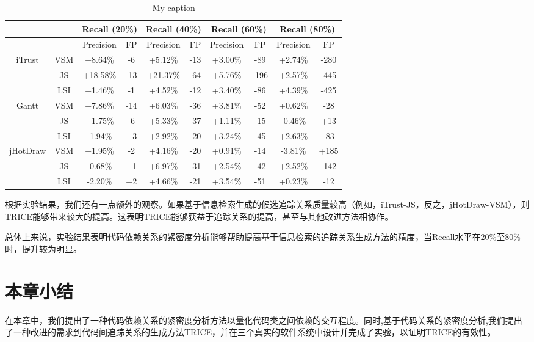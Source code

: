 \begin{table}[]
\centering
\caption{My caption}
\label{my-label}
\begin{tabular}{@{}cccccccccc@{}}
\toprule
         &     & \multicolumn{2}{c}{Recall (20\%)} & \multicolumn{2}{c}{Recall (40\%)} & \multicolumn{2}{c}{Recall (60\%)} & \multicolumn{2}{c}{Recall (80\%)} \\ \midrule
         &     & Precision          & FP           & Precision          & FP           & Precision          & FP           & Precision          & FP           \\
iTrust   & VSM & +8.64\%            & -6           & +5.12\%            & -13          & +3.00\%            & -89          & +2.74\%            & -280         \\
         & JS  & +18.58\%           & -13          & +21.37\%           & -64          & +5.76\%            & -196         & +2.57\%            & -445         \\
         & LSI & +1.46\%            & -1           & +4.52\%            & -12          & +3.40\%            & -86          & +4.39\%            & -425         \\
Gantt    & VSM & +7.86\%            & -14          & +6.03\%            & -36          & +3.81\%            & -52          & +0.62\%            & -28          \\
         & JS  & +1.75\%            & -6           & +5.33\%            & -37          & +1.11\%            & -15          & -0.46\%            & +13          \\
         & LSI & -1.94\%            & +3           & +2.92\%            & -20          & +3.24\%            & -45          & +2.63\%            & -83          \\
jHotDraw & VSM & +1.95\%            & -2           & +4.16\%            & -20          & +0.91\%            & -14          & -3.81\%            & +185         \\
         & JS  & -0.68\%            & +1           & +6.97\%            & -31          & +2.54\%            & -42          & +2.52\%            & -142         \\
         & LSI & -2.20\%            & +2           & +4.66\%            & -21          & +3.54\%            & -51          & +0.23\%            & -12          \\ \bottomrule
\end{tabular}
\end{table}

根据实验结果，我们还有一点额外的观察。如果基于信息检索生成的候选追踪关系质量较高（例如，iTrust-JS，反之，jHotDraw-VSM），则TRICE能够带来较大的提高。这表明TRICE能够获益于追踪关系的提高，甚至与其他改进方法相协作。

总体上来说，实验结果表明代码依赖关系的紧密度分析能够帮助提高基于信息检索的追踪关系生成方法的精度，当Recall水平在20\%至80\%时，提升较为明显。

\section{本章小结}

在本章中，我们提出了一种代码依赖关系的紧密度分析方法以量化代码类之间依赖的交互程度。同时,基于代码关系的紧密度分析,我们提出了一种改进的需求到代码间追踪关系的生成方法TRICE，并在三个真实的软件系统中设计并完成了实验，以证明TRICE的有效性。

% 